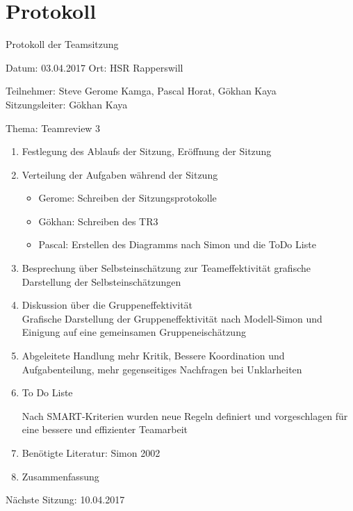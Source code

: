 \chapter{Protokoll}

Protokoll der Teamsitzung

Datum: 03.04.2017
Ort: HSR Rapperswill

Teilnehmer: Steve Gerome Kamga, Pascal Horat, Gökhan Kaya\\
Sitzungsleiter: Gökhan Kaya

Thema: Teamreview 3

\begin{enumerate}

\item Festlegung des Ablaufs der Sitzung, Eröffnung der Sitzung 

\item  Verteilung der Aufgaben während der Sitzung
\begin{itemize}
\item Gerome: Schreiben der Sitzungsprotokolle
\item Gökhan: Schreiben des TR3
\item Pascal: Erstellen des Diagramms nach Simon und die ToDo Liste
\end{itemize}

\item Besprechung über Selbsteinschätzung zur Teameffektivität
 grafische Darstellung der Selbsteinschätzungen

\item Diskussion über die Gruppeneffektivität\\
Grafische Darstellung der Gruppeneffektivität nach Modell-Simon und Einigung auf eine gemeinsamen Gruppeneischätzung

\item Abgeleitete Handlung
mehr Kritik, Bessere Koordination und Aufgabenteilung, mehr gegenseitiges Nachfragen bei Unklarheiten

\item To Do Liste

Nach SMART-Kriterien wurden neue Regeln definiert und vorgeschlagen
für eine bessere und effizienter Teamarbeit

\item Benötigte Literatur: Simon 2002 

\item Zusammenfassung

\end{enumerate}

Nächste Sitzung: 10.04.2017